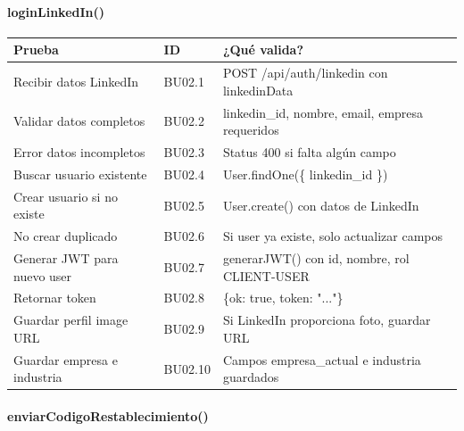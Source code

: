 \paragraph{loginLinkedIn()}

\begin{table}[H]
\centering
\begin{tabular}{|l|l|p{6cm}|}
\hline
\textbf{Prueba} & \textbf{ID} & \textbf{¿Qué valida?} \\ \hline
Recibir datos LinkedIn & BU02.1 & POST /api/auth/linkedin con linkedinData \\ \hline
Validar datos completos & BU02.2 & linkedin\_id, nombre, email, empresa requeridos \\ \hline
Error datos incompletos & BU02.3 & Status 400 si falta algún campo \\ \hline
Buscar usuario existente & BU02.4 & User.findOne(\{ linkedin\_id \}) \\ \hline
Crear usuario si no existe & BU02.5 & User.create() con datos de LinkedIn \\ \hline
No crear duplicado & BU02.6 & Si user ya existe, solo actualizar campos \\ \hline
Generar JWT para nuevo user & BU02.7 & generarJWT() con id, nombre, rol CLIENT-USER \\ \hline
Retornar token & BU02.8 & \{ok: true, token: "..."\} \\ \hline
Guardar perfil image URL & BU02.9 & Si LinkedIn proporciona foto, guardar URL \\ \hline
Guardar empresa e industria & BU02.10 & Campos empresa\_actual e industria guardados \\ \hline
\end{tabular}
\end{table}

\paragraph{enviarCodigoRestablecimiento()}

